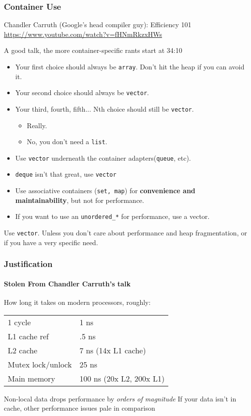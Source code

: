 
\begin{frame}[fragile]
\frametitle{Container Use}

Chandler Carruth (Google's head compiler guy): Efficiency 101
\url{https://www.youtube.com/watch?v=fHNmRkzxHWs}

A good talk, the more container-specific rants start at 34:10

\begin{itemize}
\item Your first choice should always be \texttt{array}.  Don't hit
  the heap if you can avoid it.
\item Your second choice should always be \texttt{vector}.
\item Your third, fourth, fifth... Nth choice should still be
  \texttt{vector}.
\begin{itemize}
  \item Really.
  \item No, you don't need a \texttt{list}.
\end{itemize}
\item Use \texttt{vector} underneath the container
  adapters(\texttt{queue}, etc).
\item \texttt{deque} isn't that great, use \texttt{vector}
\item Use associative containers (\texttt{set, map}) for {\bf convenience
  and maintainability}, but not for performance.
\item If you want to use an \texttt{unordered\_*} for performance, use
  a vector.
\end{itemize}

\begin{alertblock}{Use \texttt{vector}.}
Unless you don't care about performance and heap fragmentation, or if
you have a very specific need.
\end{alertblock}

\end{frame}

\begin{frame}[fragile]
\frametitle{Justification}
\framesubtitle{Stolen From Chandler Carruth's talk}
How long it takes on modern processors, roughly:
\vskip 6pt
\begin{tabular}{ll}
\hline
1 cycle & 1 ns \\
L1 cache ref & .5 ns \\
L2 cache & 7 ns   (14x L1 cache) \\
Mutex lock/unlock & 25 ns \\
Main memory & 100 ns (20x L2, 200x L1) \\ \hline
\end{tabular}

\vskip 12pt

\begin{alertblock}{Non-local data drops performance by \emph{orders of magnitude} }
If your data isn't in cache, other performance issues pale in
comparison
\end{alertblock}
\end{frame}

